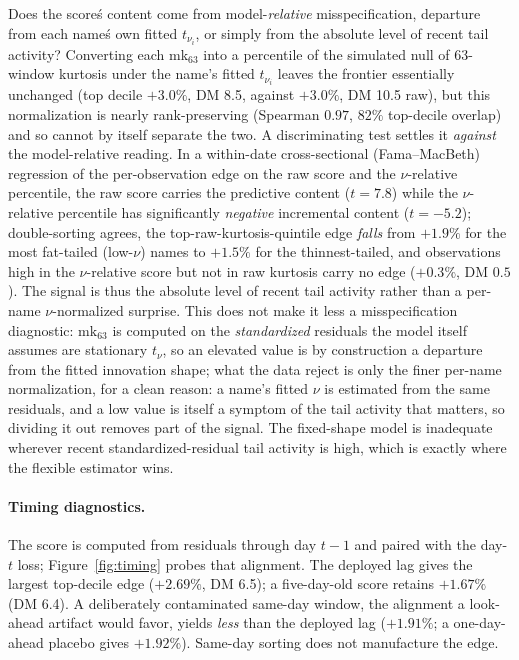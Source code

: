 \documentclass[11pt]{article}
\theoremstyle{remark}
\begin{document}
Does the score\'s content come from model-\emph{relative}
misspecification, departure from each name\'s own fitted $t_{\nu_i}$, or
simply from the absolute level of recent tail activity? Converting each
mk$_{63}$ into a percentile of the simulated null of 63-window kurtosis
under the name's fitted $t_{\nu_i}$ leaves the frontier essentially
unchanged (top decile $+3.0\%$, DM 8.5, against $+3.0\%$, DM 10.5 raw),
but this normalization is nearly rank-preserving (Spearman $0.97$, $82\%$
top-decile overlap) and so cannot by itself separate the two. A
discriminating test settles it \emph{against} the model-relative reading.
In a within-date cross-sectional (Fama--MacBeth) regression of the
per-observation edge on the raw score and the $\nu$-relative percentile,
the raw score carries the predictive content ($t=7.8$) while the
$\nu$-relative percentile has significantly \emph{negative} incremental
content ($t=-5.2$); double-sorting agrees, the top-raw-kurtosis-quintile
edge \emph{falls} from $+1.9\%$ for the most fat-tailed (low-$\nu$) names
to $+1.5\%$ for the thinnest-tailed, and observations high in the
$\nu$-relative score but not in raw kurtosis carry no edge ($+0.3\%$, DM
$0.5$). The signal is thus the absolute level of recent tail activity rather than
a per-name $\nu$-normalized surprise. This does not make it less a
misspecification diagnostic: $\mathrm{mk}_{63}$ is computed on the
\emph{standardized} residuals the model itself assumes are stationary
$t_\nu$, so an elevated value is by construction a departure from the
fitted innovation shape; what the data reject is only the finer per-name
normalization, for a clean reason: a name's fitted $\nu$ is estimated
from the same residuals, and a low value is itself a symptom of the tail
activity that matters, so dividing it out removes part of the signal. The
fixed-shape model is inadequate wherever recent standardized-residual tail
activity is high, which is exactly where the flexible estimator wins.

\paragraph{Timing diagnostics.} The score is computed from residuals
through day $t-1$ and paired with the day-$t$ loss;
Figure~\ref{fig:timing} probes that alignment. The deployed lag gives
the largest top-decile edge ($+2.69\%$, DM 6.5); a five-day-old score
retains $+1.67\%$ (DM 6.4). A deliberately contaminated same-day
window, the alignment a look-ahead artifact would favor, yields
\emph{less} than the deployed lag ($+1.91\%$; a one-day-ahead placebo
gives $+1.92\%$). Same-day sorting does not manufacture the edge.
\end{document}
